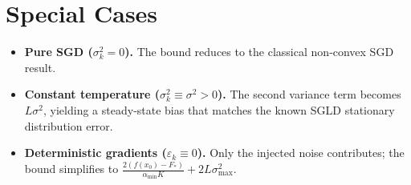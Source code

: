 \documentclass{article}
\begin{document}
\section*{Special Cases}
\begin{itemize}[noitemsep,topsep=0pt]
\item \textbf{Pure SGD ($\sigma_k^{2}=0$).} The bound reduces to the classical non‑convex SGD result.
\item \textbf{Constant temperature ($\sigma_k^{2}\equiv\sigma^{2}>0$).} The second variance term becomes $L\sigma^{2}$, yielding a steady‑state bias that matches the known SGLD stationary distribution error.
\item \textbf{Deterministic gradients ($\varepsilon_k\equiv0$).} Only the injected noise contributes; the bound simplifies to $\frac{2(f(x_0)-F_{*})}{\alpha_{\min}K}+2L\sigma_{\max}^{2}$.
\end{itemize}
\end{document}
